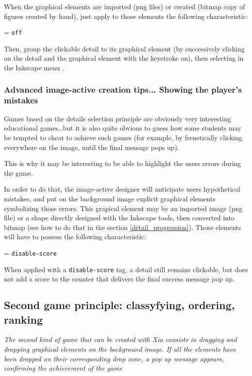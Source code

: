 When the graphical elements are imported (png files) or created (bitmap copy 
of figures created by hand), just apply to those elements the following 
charasteristic:
\begin{center}
 = \verb|off|
\end{center}
Then, group the clickable detail to its graphical element (by successively 
clicking on the detail and the graphical element with the \Shift keystroke on),
then selecting  in the Inkscape menu .

\subsubsection{Advanced image-active creation tips... Showing the player's mistakes}

Games based on the details selection principle are obviously very
interesting educational games\ldots but it is also quite obvious to guess how some 
students may be tempted to cheat to achieve such games (for example, by 
frenetically clicking everywhere on the image, until the final message pops up).

This is why it may be interesting to be able to 
highlight the users errors during the game.

In order to do that, the image-active designer will anticipate users hypothetical mistakes, and 
put on the background image explicit graphical elements symbolizing those errors. 
This grapical element may be an imported image 
(png file) or a shape directly designed with the Inkscape tools, 
then converted into bitmap (see how to do that in the section 
\ref{détail_progression}). Those elements will have to possess the following characteristic:
\begin{center}
 = \verb|disable-score| 
\end{center}
When applied with a \verb|disable-score| tag, a detail still remains clickable, but does not 
add a score to the counter that delivers the final success message pop up.

\subsection{Second game principle: classyfying, ordering, ranking}\label{gameDragAndDropsection}

\textit{The second kind of game that can be created with Xia consists in dragging and dropping graphical elements 
on the background image. If all the elements have been dropped on their corresponding drop zone, a pop up
message appears, confirming the achievement of the game}

